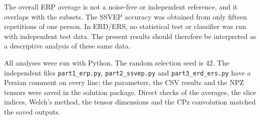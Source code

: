 The overall ERP average is not a noise-free or independent reference, and it overlaps with the subsets. The SSVEP accuracy was obtained from only fifteen repetitions of one person. In ERD/ERS, no statistical test or classifier was run with independent test data. The present results should therefore be interpreted as a descriptive analysis of these same data.

All analyses were run with Python. The random selection seed is 42. The independent files \texttt{part1\_erp.py}, \texttt{part2\_ssvep.py} and \texttt{part3\_erd\_ers.py} have a Persian comment on every line; the parameters, the CSV results and the NPZ tensors were saved in the solution package. Direct checks of the averages, the slice indices, Welch's method, the tensor dimensions and the CPz convolution matched the saved outputs.
